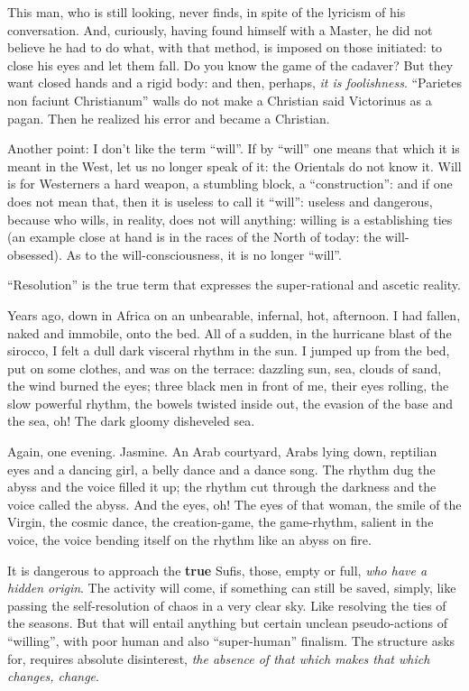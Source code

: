 This man, who is still looking, never finds, in spite of the lyricism of his conversation. And, curiously, having found himself with a Master, he did not believe he had to do what, with that method, is imposed on those initiated: to close his eyes and let them fall. Do you know the game of the cadaver? But they want closed hands and a rigid body: and then, perhaps, \emph{it is foolishness}. ``Parietes non faciunt Christianum'' walls do not make a Christian said Victorinus as a pagan. Then he realized his error and became a Christian.

Another point: I don't like the term ``will''. If by ``will'' one means that which it is meant in the West, let us no longer speak of it: the Orientals do not know it. Will is for Westerners a hard weapon, a stumbling block, a ``construction'': and if one does not mean that, then it is useless to call it ``will'': useless and dangerous, because who wills, in reality, does not will anything: willing is a establishing ties (an example close at hand is in the races of the North of today: the will-obsessed). As to the will-consciousness, it is no longer ``will''.

``Resolution'' is the true term that expresses the super-rational and ascetic reality.

Years ago, down in Africa on an unbearable, infernal, hot, afternoon. I had fallen, naked and immobile, onto the bed. All of a sudden, in the hurricane blast of the sirocco, I felt a dull dark visceral rhythm in the sun. I jumped up from the bed, put on some clothes, and was on the terrace: dazzling sun, sea, clouds of sand, the wind burned the eyes; three black men in front of me, their eyes rolling, the slow powerful rhythm, the bowels twisted inside out, the evasion of the base and the sea, oh! The dark gloomy disheveled sea.

Again, one evening. Jasmine. An Arab courtyard, Arabs lying down, reptilian eyes and a dancing girl, a belly dance and a dance song. The rhythm dug the abyss and the voice filled it up; the rhythm cut through the darkness and the voice called the abyss. And the eyes, oh! The eyes of that woman, the smile of the Virgin, the cosmic dance, the creation-game, the game-rhythm, salient in the voice, the voice bending itself on the rhythm like an abyss on fire.

It is dangerous to approach the \textbf{true} Sufis, those, empty or full, \emph{who have a hidden origin}. The activity will come, if something can still be saved, simply, like passing the self-resolution of chaos in a very clear sky. Like resolving the ties of the seasons. But that will entail anything but certain unclean pseudo-actions of ``willing'', with poor human and also ``super-human'' finalism. The structure asks for, requires absolute disinterest, \emph{the absence of that which makes that which changes, change}.

